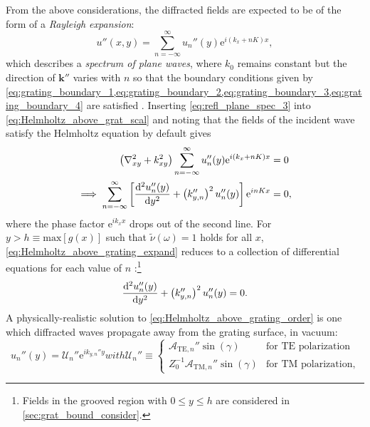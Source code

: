 From the above considerations, the diffracted fields are expected to be of the form of a \emph{Rayleigh expansion}:
\begin{equation}\label{eq:refl_plane_spec_3}
 u'' (x,y) = \sum_{n=-\infty}^{\infty} u_n'' (y) \mathrm{e}^{i \left( k_x + n K \right) x} ,
 \end{equation}
which describes a \emph{spectrum of plane waves}, where $k_0$ remains constant but the direction of $\mathbold{k''}$ varies with $n$ so that the boundary conditions given by \cref{eq:grating_boundary_1,eq:grating_boundary_2,eq:grating_boundary_3,eq:grating_boundary_4} are satisfied \cite{Petit80,antonakakis14}. 
Inserting \cref{eq:refl_plane_spec_3} into \cref{eq:Helmholtz_above_grat_scal} and noting that the fields of the incident wave satisfy the Helmholtz equation by default gives 
\begin{align}\label{eq:Helmholtz_above_grating_expand}
 \begin{split}
 \left( \nabla_{xy}^2 +  k_{xy}^2 \right) \sum_{n=-\infty}^{\infty} u_n'' (y) \mathrm{e}^{i \left( k_x + n K \right) x}  &= 0 \\
 \implies \sum_{n=-\infty}^{\infty} \left[ \dv[2]{u_n'' (y)}{y} + \left( k_{y,n}'' \right)^2 u_n'' (y) \right] \mathrm{e}^{i n K x} &= 0 ,
 \end{split}
 \end{align}
where the phase factor $\mathrm{e}^{i k_x x}$ drops out of the second line. For $y > h \equiv \text{max} \! \left[g(x)\right]$ such that $\tilde{\nu} (\omega) = 1$ holds for all $x$, \cref{eq:Helmholtz_above_grating_expand} reduces to a collection of differential equations for each value of $n$ \cite{Petit80,antonakakis14}:\footnote{Fields in the grooved region with $0 \leq y \leq h$ are considered in \cref{sec:grat_bound_consider}.}
\begin{equation}\label{eq:Helmholtz_above_grating_order}
 \dv[2]{u_n'' (y)}{y} + \left( k_{y,n}'' \right)^2 u_n'' (y) = 0 .
 \end{equation}
A physically-realistic solution to \cref{eq:Helmholtz_above_grating_order} is one which diffracted waves propagate away from the grating surface, in vacuum:
\begin{subequations}
\begin{equation}\label{eq:Helmholtz_above_grat_order_sol}
  u_n'' (y) = \mathcal{U}_n'' \mathrm{e}^{i k_{y,n}'' y}
 \end{equation}
with
\begin{equation}\label{eq:generic_amp}
 \mathcal{U}_n'' \equiv
   \begin{cases}
     \mathcal{A}_{\text{TE},n}'' \sin \left( \gamma \right) & \text{for } \text{TE polarization} \\
     Z_0^{-1} \mathcal{A}_{\text{TM},n}'' \sin \left( \gamma \right) & \text{for } \text{TM polarization,} 
   \end{cases} 
\end{equation}
\end{subequations}
